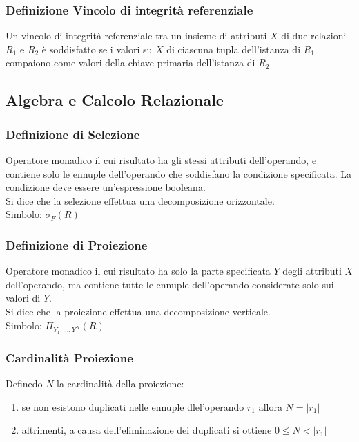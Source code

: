 \subsubsection{Definizione Vincolo di integrità referenziale}
Un vincolo di integrità referenziale tra un insieme di attributi $X$ di due relazioni
$R_{1}$ e $R_{2}$ è soddisfatto se i valori su $X$ di ciascuna tupla dell'istanza di $R_{1}$
compaiono come valori della chiave primaria dell'istanza di $R_{2}$.

\subsection{Algebra e Calcolo Relazionale}

\subsubsection{Definizione di Selezione}
Operatore monadico il cui risultato ha gli stessi attributi dell'operando, e contiene solo
le ennuple dell'operando che soddisfano la condizione specificata. La condizione deve essere
un'espressione booleana. \\
Si dice che la selezione effettua una decomposizione orizzontale. \\
Simbolo: $\sigma_{F}(R)$

\subsubsection{Definizione di Proiezione}
Operatore monadico il cui risultato ha solo la parte specificata $Y$ degli attributi $X$ dell'operando,
ma contiene tutte le ennuple dell'operando considerate solo sui valori di $Y$. \\
Si dice che la proiezione effettua una decomposizione verticale. \\
Simbolo: $\Pi_{Y_{1},...,Y^{N}}(R)$

\subsubsection{Cardinalità Proiezione}
Definedo $N$ la cardinalità della proiezione:

\begin{enumerate}
  \item se non esistono duplicati nelle ennuple dlel'operando $r_{1}$ allora $ N = \left\vert{r_{1}}\right\vert$
  \item altrimenti, a causa dell'eliminazione dei duplicati si ottiene $ 0 \leq N < \left\vert{r_{1}}\right\vert $
\end{enumerate}

